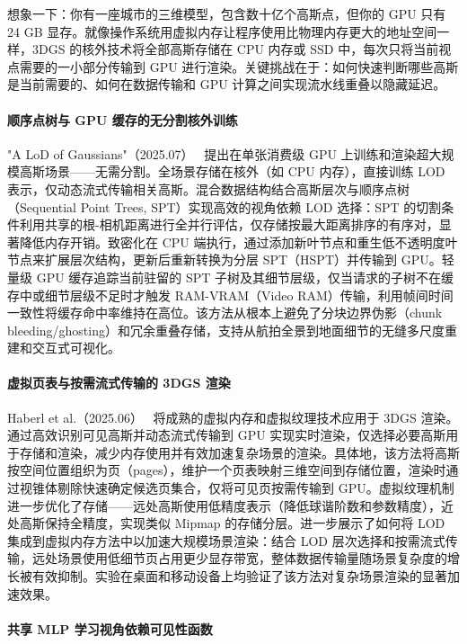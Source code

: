 想象一下：你有一座城市的三维模型，包含数十亿个高斯点，但你的 GPU 只有 24 GB 显存。就像操作系统用虚拟内存让程序使用比物理内存更大的地址空间一样，3DGS 的核外技术将全部高斯存储在 CPU 内存或 SSD 中，每次只将当前视点需要的一小部分传输到 GPU 进行渲染。关键挑战在于：如何快速判断哪些高斯是当前需要的、如何在数据传输和 GPU 计算之间实现流水线重叠以隐藏延迟。

\paragraph{顺序点树与 GPU 缓存的无分割核外训练}

"A LoD of Gaussians"（2025.07）~\cite{2507_01110} 提出在单张消费级 GPU 上训练和渲染超大规模高斯场景——无需分割。全场景存储在核外（如 CPU 内存），直接训练 LOD 表示，仅动态流式传输相关高斯。混合数据结构结合高斯层次与顺序点树（Sequential Point Trees, SPT）实现高效的视角依赖 LOD 选择：SPT 的切割条件利用共享的根-相机距离进行全并行评估，仅存储按最大距离排序的有序对，显著降低内存开销。致密化在 CPU 端执行，通过添加新叶节点和重生低不透明度叶节点来扩展层次结构，更新后重新转换为分层 SPT（HSPT）并传输到 GPU。轻量级 GPU 缓存追踪当前驻留的 SPT 子树及其细节层级，仅当请求的子树不在缓存中或细节层级不足时才触发 RAM-VRAM（Video RAM）传输，利用帧间时间一致性将缓存命中率维持在高位。该方法从根本上避免了分块边界伪影（chunk bleeding/ghosting）和冗余重叠存储，支持从航拍全景到地面细节的无缝多尺度重建和交互式可视化。

\paragraph{虚拟页表与按需流式传输的 3DGS 渲染}

Haberl et al.（2025.06）~\cite{2506_19415} 将成熟的虚拟内存和虚拟纹理技术应用于 3DGS 渲染。通过高效识别可见高斯并动态流式传输到 GPU 实现实时渲染，仅选择必要高斯用于存储和渲染，减少内存使用并有效加速复杂场景的渲染。具体地，该方法将高斯按空间位置组织为页（pages），维护一个页表映射三维空间到存储位置，渲染时通过视锥体剔除快速确定候选页集合，仅将可见页按需传输到 GPU。虚拟纹理机制进一步优化了存储——远处高斯使用低精度表示（降低球谐阶数和参数精度），近处高斯保持全精度，实现类似 Mipmap 的存储分层。进一步展示了如何将 LOD 集成到虚拟内存方法中以加速大规模场景渲染：结合 LOD 层次选择和按需流式传输，远处场景使用低细节页占用更少显存带宽，整体数据传输量随场景复杂度的增长被有效抑制。实验在桌面和移动设备上均验证了该方法对复杂场景渲染的显著加速效果。

\paragraph{共享 MLP 学习视角依赖可见性函数}

